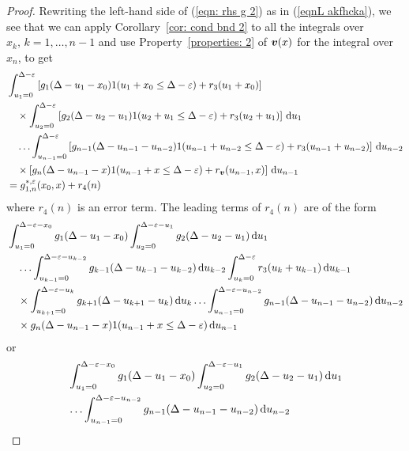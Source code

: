 \begin{proof}
	Rewriting the left-hand side of (\ref{eqn: rhs g 2}) as in (\ref{eqnL akfhcka}), we see that we can apply Corollary~\ref{cor: cond bnd 2} to all the integrals over \(x_k,\, k=1,\dots,n-1\) and use Property~\ref{properties: 2} of \({\boldsymbol v}(x)\) for the integral over \(x_n\), to get  
	\begin{align*}
		& \int_{u_1=0}^{\Delta-\varepsilon}\left[g_1(\Delta - u_1 - x_0)1(u_1 + x_0\leq \Delta - \varepsilon) + r_3 (u_1 + x_0)\right]
		\\&\quad\times\int_{u_2=0}^{\Delta-\varepsilon}\left[g_2(\Delta - u_2 - u_1)1(u_2 + u_1\leq \Delta - \varepsilon) + r_3 (u_2 + u_1)\right]\, \mathrm{d} u_1
		\\&\quad\hdots 
            	 \int_{u_{n-1}=0}^{\Delta-\varepsilon}  \left[g_{n-1}(\Delta - u_{n-1} - u_{n-2}) 1(u_{n-1} + u_{n-2}\leq \Delta - \varepsilon) +   r_3 (u_{n-1} + u_{n-2})\right] \, \mathrm{d} u_{n-2}
            	\\&\quad\times\left[g_{n}(\Delta-u_{n-1}-x)1(u_{n-1}+x\leq \Delta - \varepsilon) + r_{\boldsymbol v} (u_{n-1},x)\right]\, \mathrm{d} u_{n-1}
		\\&=g^{*,\varepsilon}_{1,n}(x_0,x) + r_4(n)
	\end{align*}
	where \(r_4(n)\) is an error term. The leading terms of \(r_4(n)\) are of the form 
	\begin{align}
		&\int_{u_1=0}^{\Delta-\varepsilon-x_0}g_1(\Delta - u_1 - x_0)
		\int_{u_2=0}^{\Delta-\varepsilon-u_1}g_2(\Delta - u_2 - u_1)\, \mathrm{d} u_1 \nonumber 
		\\&\quad\hdots\int_{u_{k-1}=0}^{\Delta-\varepsilon-u_{k-2}}g_{k-1}(\Delta - u_{k-1} - u_{k-2}) \, \mathrm{d} u_{k-2}
		\int_{u_k=0}^{\Delta-\varepsilon}r_3(u_{k}+u_{k-1}) \, \mathrm{d} u_{k-1} \nonumber 
		\\&\quad\times\int_{u_{k+1}=0}^{\Delta-\varepsilon-u_{k}}g_{k+1}(\Delta - u_{k+1} - u_{k}) \, \mathrm{d} u_{k}
		\hdots
            	\int_{u_{n-1}=0}^{\Delta-\varepsilon-u_{n-2}} g_{n-1}(\Delta - u_{n-1} - u_{n-2}) \, \mathrm{d} u_{n-2} \nonumber 
            	\\&\quad\times g_{n}(\Delta-u_{n-1}-x)1(u_{n-1}+x\leq \Delta -\varepsilon)\, \mathrm{d} u_{n-1} \label{eqn: akfj111112}
	\end{align}
	or
	\begin{align}
		&\int_{u_1=0}^{\Delta-\varepsilon-x_0}g_1(\Delta - u_1 - x_0)
		\int_{u_2=0}^{\Delta-\varepsilon-u_1}g_2(\Delta - u_2 - u_1)\wrt u_1 \nonumber 
		\\&{}\hdots
            	\int_{u_{n-1}=0}^{\Delta-\varepsilon-u_{n-2}} g_{n-1}(\Delta - u_{n-1} - u_{n-2}) \wrt u_{n-2}

\end{align}
\end{proof}

